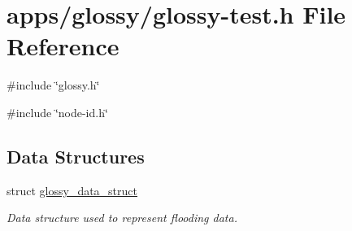 \hypertarget{glossy-test_8h}{
\section{apps/glossy/glossy-\/test.h File Reference}
\label{glossy-test_8h}
}
{\ttfamily \#include \char`\"{}glossy.h\char`\"{}}\par
{\ttfamily \#include \char`\"{}node-\/id.h\char`\"{}}\par
\subsection*{Data Structures}
\begin{DoxyCompactItemize}
\item 
struct \hyperlink{structglossy__data__struct}{glossy\_\-data\_\-struct}
\begin{DoxyCompactList}\small\item\em Data structure used to represent flooding data. \end{DoxyCompactList}\end{DoxyCompactItemize}
